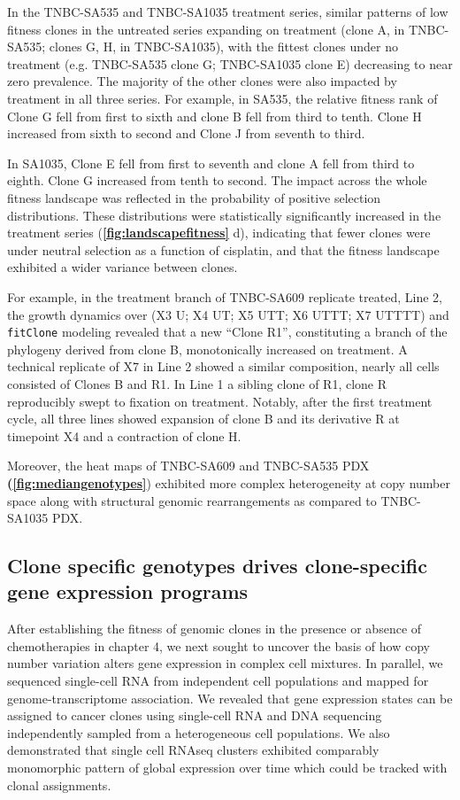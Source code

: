 In the TNBC-SA535 and TNBC-SA1035 treatment series, similar patterns of low fitness clones in the untreated series expanding on treatment (clone A, in TNBC-SA535; clones G, H, in TNBC-SA1035), with the fittest clones under no treatment (e.g. TNBC-SA535 clone G; TNBC-SA1035 clone E) decreasing to near zero prevalence. The majority of the other clones were also impacted by treatment in all three series. For example, in SA535, the relative fitness rank of Clone G fell from first to sixth and clone B fell from third to tenth.  Clone H increased from sixth to second and Clone J from seventh to third.  

In SA1035, Clone E fell from first to seventh and clone A fell from third to eighth. Clone G increased from tenth to second.  The impact across the whole fitness landscape was reflected in the probability of positive selection distributions.  These distributions were statistically significantly increased in the treatment series  (\textbf{\autoref{fig:landscapefitness}} d), indicating that fewer clones were under neutral selection as a function of cisplatin, and that the fitness landscape exhibited a wider variance between clones.

For example, in the treatment branch of TNBC-SA609 replicate treated, Line 2, the growth dynamics over (X3 U; X4 UT; X5 UTT; X6 UTTT; X7 UTTTT) and \texttt{fitClone} modeling revealed that a new ``Clone R1'', constituting a branch of the phylogeny derived from clone B, monotonically increased on treatment.  A technical replicate of X7 in Line 2 showed a similar composition, nearly all cells consisted of Clones B and R1.  In Line 1 a sibling clone of R1, clone R reproducibly swept to fixation on treatment.  Notably, after the first treatment cycle, all three lines showed expansion of clone B and its derivative R at timepoint X4 and a contraction of clone H.

Moreover, the heat maps of TNBC-SA609 and TNBC-SA535 PDX \textbf{(\autoref{fig:mediangenotypes}}) exhibited more complex heterogeneity at copy number space along with structural genomic rearrangements as compared to TNBC-SA1035 PDX.


\subsection{Clone specific genotypes drives clone-specific gene expression programs}

After establishing the fitness of genomic clones in the presence or absence of chemotherapies in chapter 4, we next sought to uncover the basis of how copy number variation alters gene expression in complex cell mixtures. In parallel, we sequenced single-cell RNA from independent cell populations and mapped for genome-transcriptome association. 
We revealed that gene expression states can be assigned to cancer clones using single-cell RNA and DNA sequencing independently sampled from a heterogeneous cell populations. We also demonstrated that single cell RNAseq clusters exhibited comparably monomorphic pattern of global expression over time which could be tracked with clonal assignments.

